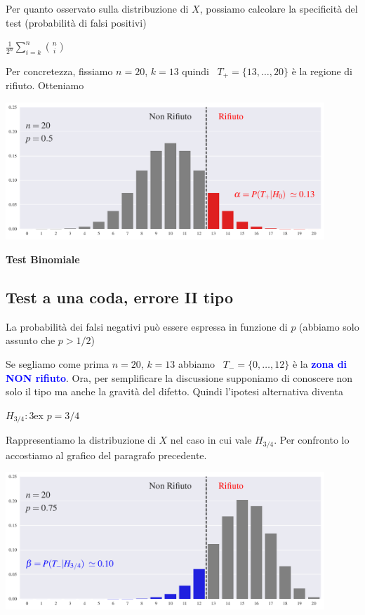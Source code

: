 \documentclass[12pt,openany]{book}
\def\emph#1{\textcolor{blue}{\textbf{\boldmath #1}}}
\theoremstyle{mio}
\theoremstyle{liscio}
\begin{document}
Per quanto osservato sulla distribuzione di $X$, possiamo calcolare la specificità del test (probabilità di falsi positivi)



\medrel{=}$\displaystyle\frac1{2^n}\sum^n_{i=k} {n\choose i}$


Per concretezza, fissiamo $n=20$, $k=13$ quindi {\color{red}\boldmath\ $T_+=\{13,\dots,20\}$} è la regione di rifiuto. Otteniamo %


\hfil\includegraphics[width=0.9\textwidth]{figure/B-test_01.pdf}


\hfill{}\clearpage\hfill\textbf{Test Binomiale}\subsection{Test a una coda, errore II tipo}

La probabilità dei falsi negativi può essere espressa in funzione di $p$ (abbiamo solo assunto che $p>1/2$)



Se segliamo come prima $n=20$, $k=13$ abbiamo {\color{blue}\boldmath\ $T_-=\{0,\dots,12\}$} è la \emph{zona di NON rifiuto}.
Ora, per semplificare la discussione supponiamo di conoscere non solo il tipo ma anche la gravità del difetto. Quindi l'ipotesi alternativa diventa

$H_{3/4}:$\kern3ex $p=3/4$

Rappresentiamo la distribuzione di $X$ nel caso in cui vale $H_{3/4}$. Per confronto lo accostiamo al grafico del paragrafo precedente. 


\hfil\includegraphics[width=0.9\textwidth]{figure/B-test_02.pdf}
\end{document}
